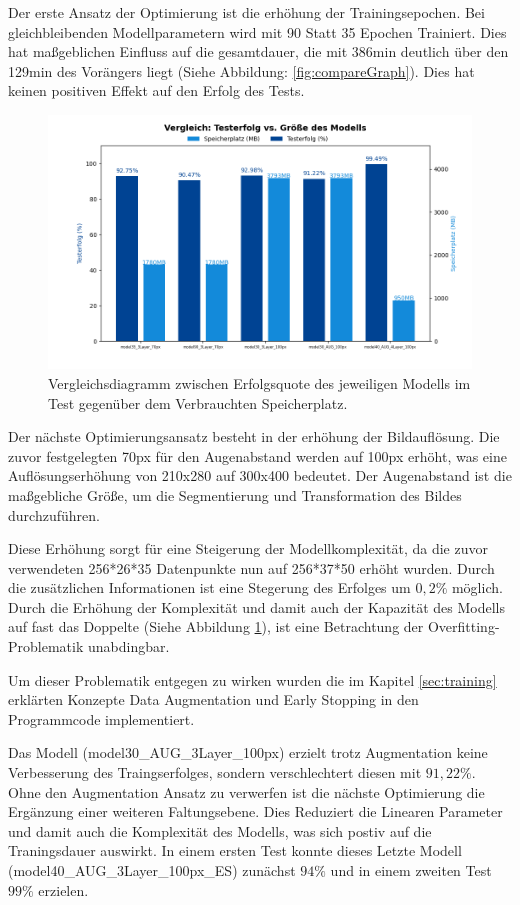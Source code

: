 \documentclass[journal,twoside,web]{ieeecolor}
\begin{document}
Der erste Ansatz der Optimierung ist die erhöhung der Trainingsepochen. Bei gleichbleibenden Modellparametern wird mit 90 Statt 35 Epochen Trainiert.
Dies hat maßgeblichen Einfluss auf die gesamtdauer, die mit 386min deutlich über den 129min des Vorängers liegt (Siehe Abbildung: \ref{fig:compareGraph}). Dies hat keinen positiven Effekt auf den Erfolg des Tests.

\begin{figure}[H]
    \centerline{\includegraphics[width=\columnwidth]{Erfolg_Groesse.png}}
    \caption{Vergleichsdiagramm zwischen Erfolgsquote des jeweiligen Modells im Test gegenüber dem Verbrauchten Speicherplatz.}
    \label{fig:compareSize}
\end{figure}

Der nächste Optimierungsansatz besteht in der erhöhung der Bildauflösung. Die zuvor festgelegten 70px für den Augenabstand werden auf 100px erhöht, was eine Auflösungserhöhung von 210x280 auf 300x400 bedeutet.
Der Augenabstand ist die maßgebliche Größe, um die Segmentierung und Transformation des Bildes durchzuführen.

Diese Erhöhung sorgt für eine Steigerung der Modellkomplexität, da die zuvor verwendeten 256*26*35 Datenpunkte nun auf 256*37*50 erhöht wurden. 
Durch die zusätzlichen Informationen ist eine Stegerung des Erfolges um $0,2\%$ möglich. Durch die Erhöhung der Komplexität und damit auch der Kapazität des Modells auf fast das Doppelte (Siehe Abbildung \ref{fig:compareSize}), ist eine Betrachtung der Overfitting-Problematik unabdingbar.

Um dieser Problematik entgegen zu wirken wurden die im Kapitel \ref{sec:training} erklärten Konzepte Data Augmentation und Early Stopping in den Programmcode implementiert.

Das Modell (model30\_AUG\_3Layer\_100px) erzielt trotz Augmentation keine Verbesserung des Traingserfolges, sondern verschlechtert diesen mit $91,22\%$. 
Ohne den Augmentation Ansatz zu verwerfen ist die nächste Optimierung die Ergänzung einer weiteren Faltungsebene. 
Dies Reduziert die Linearen Parameter und damit auch die Komplexität des Modells, was sich postiv auf die Traningsdauer auswirkt. 
In einem ersten Test konnte dieses Letzte Modell (model40\_AUG\_3Layer\_100px\_ES) zunächst $94\%$ und in einem zweiten Test $99\%$ erzielen.
\end{document}
